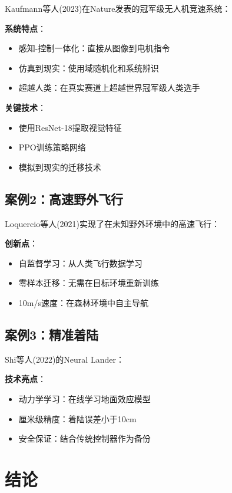 \documentclass[12pt,a4paper]{ctexart}
\begin{document}
Kaufmann等人(2023)在Nature发表的冠军级无人机竞速系统：

\textbf{系统特点}：
\begin{itemize}
    \item 感知-控制一体化：直接从图像到电机指令
    \item 仿真到现实：使用域随机化和系统辨识
    \item 超越人类：在真实赛道上超越世界冠军级人类选手
\end{itemize}

\textbf{关键技术}：
\begin{itemize}
    \item 使用ResNet-18提取视觉特征
    \item PPO训练策略网络
    \item 模拟到现实的迁移技术
\end{itemize}

\subsection{案例2：高速野外飞行}

Loquercio等人(2021)实现了在未知野外环境中的高速飞行：

\textbf{创新点}：
\begin{itemize}
    \item 自监督学习：从人类飞行数据学习
    \item 零样本迁移：无需在目标环境重新训练
    \item 10m/s速度：在森林环境中自主导航
\end{itemize}

\subsection{案例3：精准着陆}

Shi等人(2022)的Neural Lander：

\textbf{技术亮点}：
\begin{itemize}
    \item 动力学学习：在线学习地面效应模型
    \item 厘米级精度：着陆误差小于10cm
    \item 安全保证：结合传统控制器作为备份
\end{itemize}

\section{结论}\label{sec:conclusion}
\end{document}
